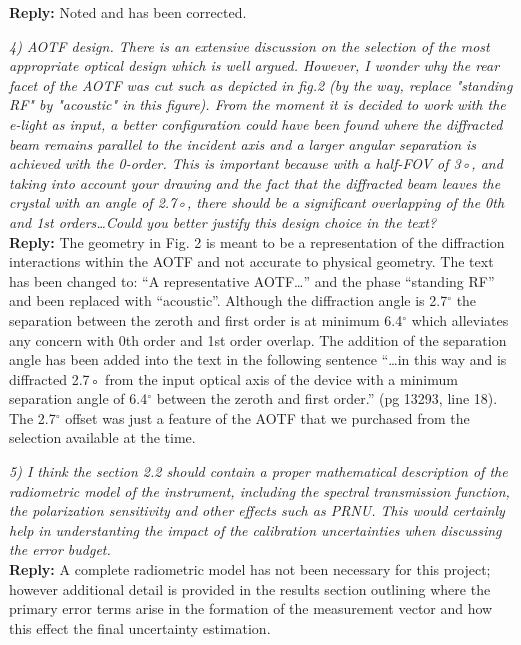 \documentclass[12pt, notitlepage]{article}
\begin{document}
\textbf{Reply:} Noted and has been corrected.

\hrulefill

\textit{4) AOTF design. There is an extensive discussion on the selection of the most appropriate
optical design which is well argued. However, I wonder why the rear facet of the
AOTF was cut such as depicted in fig.2 (by the way, replace "standing RF" by "acoustic"
in this figure). From the moment it is decided to work with the e-light as input, a
better configuration could have been found where the diffracted beam remains parallel
to the incident axis and a larger angular separation is achieved with the 0-order. This is
important because with a half-FOV of 3◦, and taking into account your drawing and the
fact that the diffracted beam leaves the crystal with an angle of 2.7◦, there should be a
significant overlapping of the 0th and 1st orders\ldots Could you better justify this design
choice in the text?}\\

\textbf{Reply:} The geometry in Fig. 2 is meant to be a representation of the diffraction interactions within the AOTF and not accurate to physical geometry. The text has been changed to: ``A representative AOTF\ldots'' and the phase ``standing RF'' and been replaced with ``acoustic''. Although the diffraction angle is 2.7$^{\circ}$ the separation between the zeroth and first order is at minimum 6.4$^{\circ}$ which alleviates any concern with 0th order and 1st order overlap. The addition of the separation angle has been added into the text in the following sentence ``\ldots in this way and is diffracted 2.7◦ from the input optical axis of the device with a minimum separation angle of 6.4$^{\circ}$ between the zeroth and first order.'' (pg 13293, line 18). The 2.7$^{\circ}$ offset was just a feature of the AOTF that we purchased from the selection available at the time.

\hrulefill

\textit{5) I think the section 2.2 should contain a proper mathematical description of the radiometric
model of the instrument, including the spectral transmission function, the
polarization sensitivity and other effects such as PRNU. This would certainly help in
understanting the impact of the calibration uncertainties when discussing the error budget.}\\

\textbf{Reply:} A complete radiometric model has not been necessary for this project; however additional detail is provided in the results section outlining where the primary error terms arise in the formation of the measurement vector and how this effect the final uncertainty estimation.
\end{document}

